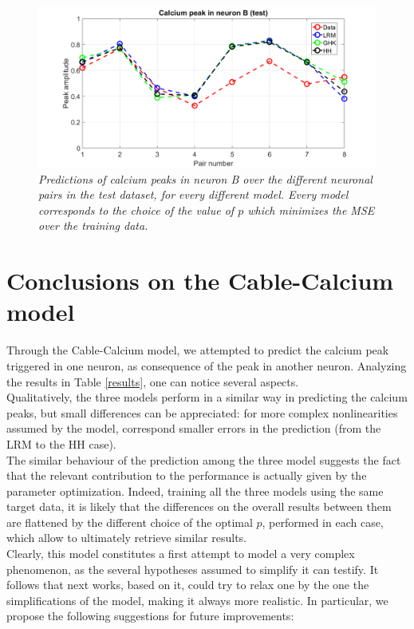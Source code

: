 \documentclass[12pt, a4paper]{report}
\begin{document}
	


\begin{figure}[H]
	\begin{center}
		\hspace*{-1.5 cm}
		\includegraphics[scale=0.5]{test_model.png} 
	\end{center} 
	\caption{\textit{Predictions of calcium peaks in neuron B over the different neuronal pairs in the test dataset, for every different model. Every model corresponds to the choice of the value of $p$ which minimizes the MSE over the training data.}}
	\label{test}
\end{figure}

\section{Conclusions on the Cable-Calcium model} \label{section cablec conclusions}

Through the Cable-Calcium model, we attempted to predict the calcium peak triggered in one neuron, as consequence of the peak in another neuron. Analyzing the results in Table \ref{results}, one can notice several aspects.\\
Qualitatively, the three models perform in a similar way in predicting the calcium peaks, but small differences can be appreciated: for more complex nonlinearities assumed by the model, correspond smaller errors in the prediction (from the LRM to the HH case).\\
The similar behaviour of the prediction among the three model suggests the fact that the relevant contribution to the performance is actually given by the parameter optimization. Indeed, training all the three models using the same target data, it is likely that the differences on the overall results between them are flattened by the different choice of the optimal $p$, performed in each case, which allow to ultimately retrieve  similar results.\\
Clearly, this model constitutes a first attempt to model a very complex phenomenon, as the several hypotheses assumed to simplify it can testify. It follows that next works, based on it, could try to relax one by the one the simplifications of the model, making it always more realistic. In particular, we propose the following suggestions for future improvements:
\end{document}
